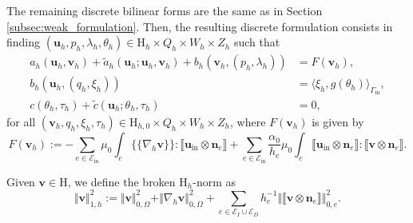 \documentclass[onefignum,onetabnum,reqno,a4paper,final]{siamart250211}
\def\O{\Omega}
\newcommand{\jump}[1]{\llbracket #1 \rrbracket}
\newcommand{\mean}[1]{\{\!\!\{#1\}\!\!\}}
\newcommand\bu{\boldsymbol{u}}
\newcommand\bv{\boldsymbol{v}}
\newcommand\bn{\boldsymbol{n}}
\newcommand\0{\mathbf{0}}
\newcommand\CE{\mathcal{E}}
\renewcommand\H{\mathrm{H}}
\newcommand\bH{\boldsymbol{\mathrm{H}}}
\renewcommand\O{\Omega}
\newcommand\Gm{\Gamma_{\mathrm{m}}}
\numberwithin{figure}{section}
\numberwithin{table}{section}
\begin{document}
	
	The remaining discrete bilinear forms are the same as in Section \ref{subsec:weak_formulation}. 	Then, the resulting discrete formulation consists in finding $(\bu_h,p_h,\lambda_h,\theta_h)\in \bH_h\times Q_h\times W_h\times Z_h$ such that
	\begin{equation}
		\label{eq:cross-flow-fv1-discrete-nonconforming}
		\begin{aligned}
			a_h(\bu_h,\bv_h)+ \widetilde{a}_h(\bu_h;\bu_h,\bv_h) + b_h(\bv_h,(p_h,\lambda_h)) &=F(\bv_h) ,\\
			b_h(\bu_h,(q_h,\xi_h)) &= 
  {\langle\xi_h, g(\theta_h)\rangle_{\Gm}},\\
			c(\theta_h,\tau_h) + \widetilde{c}(\bu_h;\theta_h,\tau_h)&=0,
		\end{aligned}
	\end{equation}
	for all $(\bv_h,q_h,\xi_h,\tau_h)\in {\bH_{h,0}} \times Q_h\times W_h\times Z_h$, where $F(\bv_h)$ is given by
 $$
 {F(\bv_h):=-\sum_{e\in\CE_{\mathrm{in}}}\mu_0\int_e\mean{\nabla_h\bv } :\jump{\bu_{\mathrm{in}}\otimes\bn_e} + \sum_{e\in\CE_{\mathrm{in}}}\frac{\alpha_0}{h_e}\mu_0\int_e\jump{\bu_{\mathrm{in}}\otimes\bn_e} :\jump{\bv\otimes\bn_e}.}
 $$


Given $\bv\in\bH$, we define the broken $\bH_h$-norm as 
	\begin{equation}
		\label{eq:broken-H1-norm}
		\Vert \bv\Vert_{1,h}^ 2:= \Vert \bv\Vert_{0,\O}^2 + \Vert \nabla_h \bv\Vert_{0,\O}^2 + \sum_{e\in\mathcal{E}_I\cup\mathcal{E}_D}h_e^{-1}\Vert\jump{\bv\otimes\bn_e}\Vert^2_{0,e}. 
	\end{equation}
 
\end{document}
